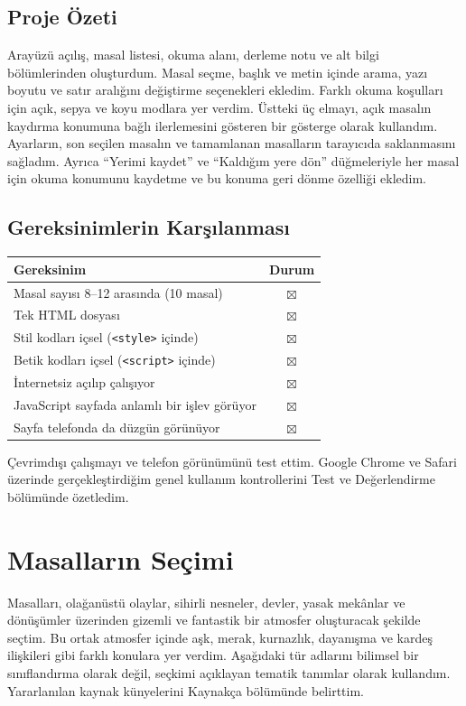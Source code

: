 \documentclass[12pt,a4paper]{article}
\begin{document}
\subsection{Proje Özeti}
Arayüzü açılış, masal listesi, okuma alanı, derleme notu ve alt bilgi bölümlerinden oluşturdum. Masal seçme, başlık ve metin içinde arama, yazı boyutu ve satır aralığını değiştirme seçenekleri ekledim. Farklı okuma koşulları için açık, sepya ve koyu modlara yer verdim. Üstteki üç elmayı, açık masalın kaydırma konumuna bağlı ilerlemesini gösteren bir gösterge olarak kullandım. Ayarların, son seçilen masalın ve tamamlanan masalların tarayıcıda saklanmasını sağladım. Ayrıca ``Yerimi kaydet'' ve ``Kaldığım yere dön'' düğmeleriyle her masal için okuma konumunu kaydetme ve bu konuma geri dönme özelliği ekledim.

\subsection{Gereksinimlerin Karşılanması}
\begin{center}
\begin{tabular}{@{}p{11.7cm}c@{}}
\toprule
\textbf{Gereksinim} & \textbf{Durum}\\\midrule
Masal sayısı 8--12 arasında (10 masal) & $\boxtimes$\\
Tek HTML dosyası & $\boxtimes$\\
Stil kodları içsel (\texttt{<style>} içinde) & $\boxtimes$\\
Betik kodları içsel (\texttt{<script>} içinde) & $\boxtimes$\\
İnternetsiz açılıp çalışıyor & $\boxtimes$\\
JavaScript sayfada anlamlı bir işlev görüyor & $\boxtimes$\\
Sayfa telefonda da düzgün görünüyor & $\boxtimes$\\
\bottomrule
\end{tabular}
\end{center}
Çevrimdışı çalışmayı ve telefon görünümünü test ettim. Google Chrome ve Safari üzerinde gerçekleştirdiğim genel kullanım kontrollerini Test ve Değerlendirme bölümünde özetledim.

\section{Masalların Seçimi}
Masalları, olağanüstü olaylar, sihirli nesneler, devler, yasak mekânlar ve dönüşümler üzerinden gizemli ve fantastik bir atmosfer oluşturacak şekilde seçtim. Bu ortak atmosfer içinde aşk, merak, kurnazlık, dayanışma ve kardeş ilişkileri gibi farklı konulara yer verdim. Aşağıdaki tür adlarını bilimsel bir sınıflandırma olarak değil, seçkimi açıklayan tematik tanımlar olarak kullandım. Yararlanılan kaynak künyelerini Kaynakça bölümünde belirttim.
\end{document}
